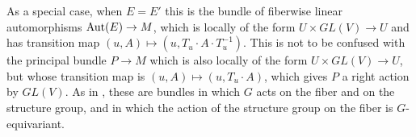 \documentclass[11pt]{amsart}
\theoremstyle{definition}
\numberwithin{equation}{section}
\numberwithin{figure}{section}
\newcommand{\Aut}{\textup{Aut}}
\newcommand{\ourdefn}[1]{{\it #1}}
\begin{document}
As a special case, when $E = E'$ this is the bundle of fiberwise linear automorphisms $\Aut(E) \to M$, which is locally of the form $U \times GL(V) \to U$ and has transition map $(u,A) \mapsto (u,T_u \cdot A \cdot T_u^{-1})$. This is not to be confused with the principal bundle $P \to M$ which is also locally of the form $U \times GL(V) \to U$, but whose transition map is $(u,A) \mapsto (u,T_u \cdot A)$, which gives $P$ a right action by $GL(V)$.
As in \cite{GMM}, these are bundles in which $G$ acts on the fiber and on the structure group, and in which the action of the structure group on the fiber is $G$-equivariant. %
\end{document}
